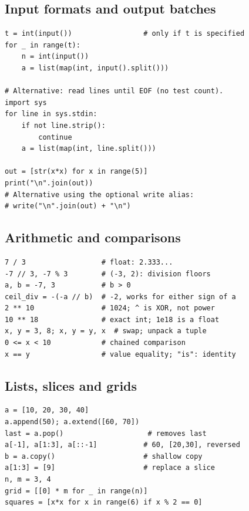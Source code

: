 \subsection{Input formats and output batches}\label{py:formats}
\begin{lstlisting}
t = int(input())                 # only if t is specified
for _ in range(t):
    n = int(input())
    a = list(map(int, input().split()))

# Alternative: read lines until EOF (no test count).
import sys
for line in sys.stdin:
    if not line.strip():
        continue
    a = list(map(int, line.split()))

out = [str(x*x) for x in range(5)]
print("\n".join(out))
# Alternative using the optional write alias:
# write("\n".join(out) + "\n")
\end{lstlisting}

\subsection{Arithmetic and comparisons}
\begin{lstlisting}[label=py:arithmetic]
7 / 3                  # float: 2.333...
-7 // 3, -7 % 3        # (-3, 2): division floors
a, b = -7, 3           # b > 0
ceil_div = -(-a // b)  # -2, works for either sign of a
2 ** 10                # 1024; ^ is XOR, not power
10 ** 18               # exact int; 1e18 is a float
x, y = 3, 8; x, y = y, x  # swap; unpack a tuple
0 <= x < 10            # chained comparison
x == y                 # value equality; "is": identity
\end{lstlisting}

\subsection{Lists, slices and grids}
\begin{lstlisting}[label=py:lists]
a = [10, 20, 30, 40]
a.append(50); a.extend([60, 70])
last = a.pop()                    # removes last
a[-1], a[1:3], a[::-1]           # 60, [20,30], reversed
b = a.copy()                     # shallow copy
a[1:3] = [9]                     # replace a slice
n, m = 3, 4
grid = [[0] * m for _ in range(n)]
squares = [x*x for x in range(6) if x % 2 == 0]
\end{lstlisting}

